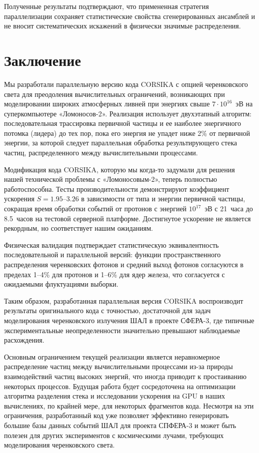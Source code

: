 \documentclass[aps,preprint,showpacs,aps,amsmath,showkeys,nobibnotes,nofootinbib,footnotes,superscriptaddress]{revtex4-2}
\begin{document}
Полученные результаты подтверждают, что примененная стратегия параллелизации сохраняет статистические свойства сгенерированных ансамблей и не вносит систематических искажений в физически значимые распределения.


\section{Заключение}

Мы разработали параллельную версию кода CORSIKA с опцией черенковского света для преодоления вычислительных ограничений, возникающих при моделировании широких атмосферных ливней при энергиях свыше $7\cdot10^{16}$~эВ на суперкомпьютере «Ломоносов-2». Реализация использует двухэтапный алгоритм: последовательная трассировка первичной частицы и ее наиболее энергичного потомка (лидера) до тех пор, пока его энергия не упадет ниже 2\% от первичной энергии, за которой следует параллельная обработка результирующего стека частиц, распределенного между вычислительными процессами.

Модификация кода CORSIKA, которую мы когда-то задумали для решения нашей технической проблемы с «Ломоносовым-2», теперь полностью работоспособна. Тесты производительности демонстрируют коэффициент ускорения $S = 1.95$--$3.26$ в зависимости от типа и энергии первичной частицы, сокращая время обработки событий от протонов с энергией $10^{17}$~эВ с 21~часа до 8.5~часов на тестовой серверной платформе. Достигнутое ускорение не является рекордным, но соответствует нашим ожиданиям.

Физическая валидация подтверждает статистическую эквивалентность последовательной и параллельной версий: функции пространственного распределения черенковских фотонов и средний выход фотонов согласуются в пределах 1--4\% для протонов и 1--6\% для ядер железа, что согласуется с ожидаемыми флуктуациями выборки.

Таким образом, разработанная параллельная версия CORSIKA воспроизводит результаты оригинального кода с точностью, достаточной для задач моделирования черенковского излучения ШАЛ в проекте СФЕРА-3, где типичные экспериментальные неопределенности значительно превышают наблюдаемые расхождения.

Основным ограничением текущей реализации является неравномерное распределение частиц между вычислительными процессами из-за природы взаимодействий частиц высоких энергий, что иногда приводит к простаиванию некоторых процессов. Будущая работа будет сосредоточена на оптимизации алгоритма разделения стека и исследовании ускорения на GPU в наших вычислениях, по крайней мере, для некоторых фрагментов кода. Несмотря на эти ограничения, разработанный код уже позволяет эффективно генерировать большие базы данных событий ШАЛ для проекта СПФЕРА-3 и может быть полезен для других экспериментов с космическими лучами, требующих моделирования черенковского света.
\end{document}
